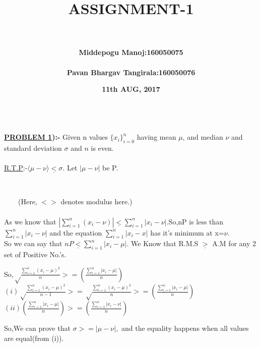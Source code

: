 \documentclass[a4paper]{article}
\title{\Huge{\textbf{ASSIGNMENT-1\\ \ \\}}}
\date{\LARGE{\textbf {11th AUG, 2017\\ \ \\}}}
\author{\LARGE{\textbf{Middepogu Manoj:160050075}}\\ \ \\
\LARGE{\textbf{Pavan Bhargav Tangirala:160050076}}}
\begin{document}
\maketitle
\newpage
\begin{flushleft}
\Large{\textbf{\underline{PROBLEM 1}):-}}
Given n values $\{x_i\}_{i=0}^n$ having mean $\mu$, and median $\nu$ and standard deviation $\sigma$ and $n$ is even.\\
\ \\
\underline{R.T.P}:-$\langle\mu-\nu\rangle \underline{<}\sigma.$ 
	\LARGE{
	Let $|\mu-\nu|$ be P.}\\
\begin{center}
  \LARGE{
	}\\
\end{center}
\ \ \ \ (Here, $<>$ denotes modulus here.)\\ \ \\
\Large{As we know that $|\sum_{i=1}^{n} {(x_i-\nu)}| \underline{<} \sum_{i=1}^{n} |x_i-\nu|$.So,nP is less than $\sum_{i=1}^{n} |x_i-\nu|$ and the equation $\sum_{i=1}^{n} |x_i-x|$ has it's minimum at x=$\nu$.\\
So we can say that  $nP \underline{<} \sum_{i=1}^{n} |x_i-\mu|$.
We Know that R.M.S $\underline{>}$ A.M for any 2 set of Positive No.'s.\\
}
\begin{center}
\LARGE{So,$\sqrt\frac{\sum_{i=1}^{n} (x_i-\mu)^2}{n} >= (\frac{\sum_{i=1}^{n} |x_i-\mu|}{n})$\\

$(i)\sqrt\frac{\sum_{i=1}^{n} (x_i-\mu)^2}{n-1} >= \sqrt\frac{\sum_{i=1}^{n} (x_i-\mu)^2}{n}>=(\frac{\sum_{i=1}^{n} |x_i-\mu|}{n})$\\

$(ii)(\frac{\sum_{i=1}^{n} |x_i-\mu|}{n})>=(\frac{\sum_{i=1}^{n} |x_i-\nu|}{n})$
}\\
\end{center}
So,We can prove that $\sigma >= |\mu - \nu|,$ and the equality happens when all values are equal(from (i)).
\end{flushleft}
\newpage
\end{document}

